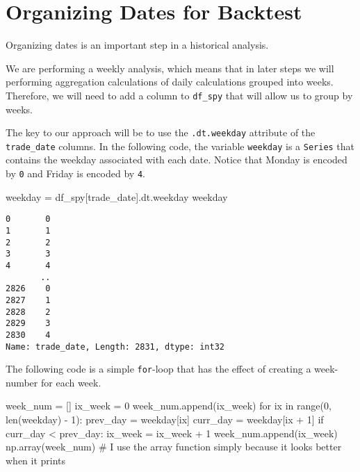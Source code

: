 \documentclass[
  letterpaper,
  DIV=11,
  numbers=noendperiod]{scrreprt}
\newenvironment{Shaded}{\begin{snugshade}}{\end{snugshade}}
\newcommand{\BuiltInTok}[1]{\textcolor[rgb]{0.00,0.23,0.31}{#1}}
\newcommand{\CommentTok}[1]{\textcolor[rgb]{0.37,0.37,0.37}{#1}}
\newcommand{\ControlFlowTok}[1]{\textcolor[rgb]{0.00,0.23,0.31}{#1}}
\newcommand{\DecValTok}[1]{\textcolor[rgb]{0.68,0.00,0.00}{#1}}
\newcommand{\KeywordTok}[1]{\textcolor[rgb]{0.00,0.23,0.31}{#1}}
\newcommand{\NormalTok}[1]{\textcolor[rgb]{0.00,0.23,0.31}{#1}}
\newcommand{\OperatorTok}[1]{\textcolor[rgb]{0.37,0.37,0.37}{#1}}
\newcommand{\StringTok}[1]{\textcolor[rgb]{0.13,0.47,0.30}{#1}}
\begin{document}
\hypertarget{organizing-dates-for-backtest}{%
\section{Organizing Dates for
Backtest}\label{organizing-dates-for-backtest}}

Organizing dates is an important step in a historical analysis.

We are performing a weekly analysis, which means that in later steps we
will performing aggregation calculations of daily calculations grouped
into weeks. Therefore, we will need to add a column to \texttt{df\_spy}
that will allow us to group by weeks.

The key to our approach will be to use the \texttt{.dt.weekday}
attribute of the \texttt{trade\_date} columns. In the following code,
the variable \texttt{weekday} is a \texttt{Series} that contains the
weekday associated with each date. Notice that Monday is encoded by
\texttt{0} and Friday is encoded by \texttt{4}.

\begin{Shaded}
\begin{Highlighting}[]
\NormalTok{weekday }\OperatorTok{=}\NormalTok{ df\_spy[}\StringTok{\textquotesingle{}trade\_date\textquotesingle{}}\NormalTok{].dt.weekday}
\NormalTok{weekday}
\end{Highlighting}
\end{Shaded}

\begin{verbatim}
0       0
1       1
2       2
3       3
4       4
       ..
2826    0
2827    1
2828    2
2829    3
2830    4
Name: trade_date, Length: 2831, dtype: int32
\end{verbatim}

The following code is a simple \texttt{for}-loop that has the effect of
creating a week-number for each week.

\begin{Shaded}
\begin{Highlighting}[]
\NormalTok{week\_num }\OperatorTok{=}\NormalTok{ []}
\NormalTok{ix\_week }\OperatorTok{=} \DecValTok{0}
\NormalTok{week\_num.append(ix\_week)}
\ControlFlowTok{for}\NormalTok{ ix }\KeywordTok{in} \BuiltInTok{range}\NormalTok{(}\DecValTok{0}\NormalTok{, }\BuiltInTok{len}\NormalTok{(weekday) }\OperatorTok{{-}} \DecValTok{1}\NormalTok{):}
\NormalTok{    prev\_day }\OperatorTok{=}\NormalTok{ weekday[ix]}
\NormalTok{    curr\_day }\OperatorTok{=}\NormalTok{ weekday[ix }\OperatorTok{+} \DecValTok{1}\NormalTok{]}
    \ControlFlowTok{if}\NormalTok{ curr\_day }\OperatorTok{\textless{}}\NormalTok{ prev\_day:}
\NormalTok{        ix\_week }\OperatorTok{=}\NormalTok{ ix\_week }\OperatorTok{+} \DecValTok{1}
\NormalTok{    week\_num.append(ix\_week)}
\NormalTok{np.array(week\_num) }\CommentTok{\# I use the array function simply because it looks better when it prints}
\end{Highlighting}
\end{Shaded}
\end{document}
